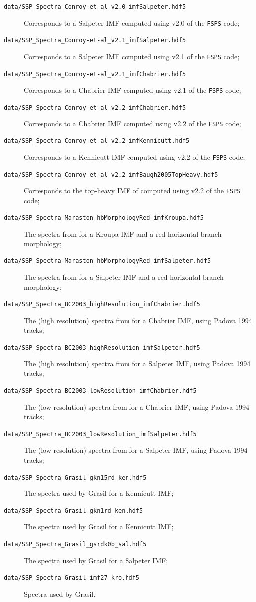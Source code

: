 \begin{description}
 \item [{\tt data/SSP\_Spectra\_Conroy-et-al\_v2.0\_imfSalpeter.hdf5}] Corresponds to a Salpeter IMF computed using v2.0 of the {\tt FSPS} code;
 \item [{\tt data/SSP\_Spectra\_Conroy-et-al\_v2.1\_imfSalpeter.hdf5}]  Corresponds to a Salpeter IMF computed using v2.1 of the {\tt FSPS} code;
 \item [{\tt data/SSP\_Spectra\_Conroy-et-al\_v2.1\_imfChabrier.hdf5}]  Corresponds to a Chabrier IMF computed using v2.1 of the {\tt FSPS} code;
 \item [{\tt data/SSP\_Spectra\_Conroy-et-al\_v2.2\_imfChabrier.hdf5}]  Corresponds to a Chabrier IMF computed using v2.2 of the {\tt FSPS} code;
 \item [{\tt data/SSP\_Spectra\_Conroy-et-al\_v2.2\_imfKennicutt.hdf5}]  Corresponds to a Kennicutt IMF computed using v2.2 of the {\tt FSPS} code;
 \item [{\tt data/SSP\_Spectra\_Conroy-et-al\_v2.2\_imfBaugh2005TopHeavy.hdf5}]  Corresponds to the top-heavy IMF of \cite{baugh_can_2005} computed using v2.2 of the {\tt FSPS} code;
 \item [{\tt data/SSP\_Spectra\_Maraston\_hbMorphologyRed\_imfKroupa.hdf5}] The spectra from \cite{maraston_evolutionary_2005} for a Kroupa IMF and a red horizontal branch morphology;
 \item [{\tt data/SSP\_Spectra\_Maraston\_hbMorphologyRed\_imfSalpeter.hdf5}] The spectra from \cite{maraston_evolutionary_2005} for a Salpeter IMF and a red horizontal branch morphology; 
 \item [{\tt data/SSP\_Spectra\_BC2003\_highResolution\_imfChabrier.hdf5}] The (high resolution) spectra from \cite{bruzual_stellar_2003} for a Chabrier IMF, using Padova 1994 tracks;
 \item [{\tt data/SSP\_Spectra\_BC2003\_highResolution\_imfSalpeter.hdf5}] The (high resolution) spectra from \cite{bruzual_stellar_2003} for a Salpeter IMF, using Padova 1994 tracks;
 \item [{\tt data/SSP\_Spectra\_BC2003\_lowResolution\_imfChabrier.hdf5}] The (low resolution) spectra from \cite{bruzual_stellar_2003} for a Chabrier IMF, using Padova 1994 tracks;
 \item [{\tt data/SSP\_Spectra\_BC2003\_lowResolution\_imfSalpeter.hdf5}] The (low resolution) spectra from \cite{bruzual_stellar_2003} for a Salpeter IMF, using Padova 1994 tracks;
 \item [{\tt data/SSP\_Spectra\_Grasil\_gkn15rd\_ken.hdf5}] The spectra used by {\sc Grasil} for a Kennicutt IMF;
 \item [{\tt data/SSP\_Spectra\_Grasil\_gkn1rd\_ken.hdf5}] The spectra used by {\sc Grasil} for a Kennicutt IMF;
 \item [{\tt data/SSP\_Spectra\_Grasil\_gsrdk0b\_sal.hdf5}] The spectra used by {\sc Grasil} for a Salpeter IMF;
 \item [{\tt data/SSP\_Spectra\_Grasil\_imf27\_kro.hdf5}] Spectra used by {\sc Grasil}.
\end{description}
